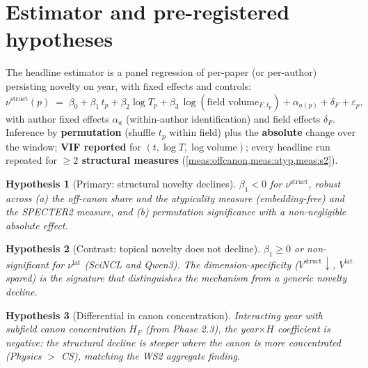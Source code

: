 \documentclass[11pt,letterpaper]{article}
\theoremstyle{definition}
\theoremstyle{plain}
\newtheorem{hypothesis}{Hypothesis}
\newcommand{\Vstruct}{V^{\mathrm{struct}}}
\newcommand{\Vlat}{V^{\mathrm{lat}}}
\begin{document}
\section{Estimator and pre-registered hypotheses}\label{sec:hypotheses}

The headline estimator is a panel regression of per-paper (or per-author)
persisting novelty on year, with fixed effects and controls:
\begin{equation}\label{eq:panel}
  \nu^{\mathrm{struct}}(p) \;=\; \beta_0 + \beta_1\,t_p
    + \beta_2 \log T_p + \beta_3\,\log(\text{field volume}_{F,t_p})
    + \alpha_{a(p)} + \delta_{F} + \varepsilon_p ,
\end{equation}
with author fixed effects $\alpha_a$ (within-author identification) and field
effects $\delta_F$. Inference by \textbf{permutation} (shuffle $t_p$ within
field) plus the \textbf{absolute} change over the window; \textbf{VIF reported}
for $(t,\log T,\log\text{volume})$; every headline run repeated for
\textbf{$\ge 2$ structural measures} (\cref{meas:offcanon,meas:atyp,meas:s2}).

\begin{hypothesis}[Primary: structural novelty declines]\label{hyp:decline}
$\beta_1 < 0$ for $\nu^{\mathrm{struct}}$, robust across (a) the off-canon share
and the atypicality measure (embedding-free) \emph{and} the SPECTER2 measure, and
(b) permutation significance with a non-negligible absolute effect.
\end{hypothesis}

\begin{hypothesis}[Contrast: topical novelty does not decline]\label{hyp:contrast}
$\beta_1 \ge 0$ or non-significant for $\nu^{\mathrm{lat}}$ (SciNCL and Qwen3).
The dimension-specificity ($\Vstruct\!\downarrow$, $\Vlat$ spared) is the
signature that distinguishes the mechanism from a generic novelty decline.
\end{hypothesis}

\begin{hypothesis}[Differential in canon concentration]\label{hyp:gradient}
Interacting year with subfield canon concentration $H_F$ (from Phase 2.3),
the year$\times H$ coefficient is negative: the structural decline is
\emph{steeper where the canon is more concentrated} (Physics $>$ CS), matching
the WS2 aggregate finding.
\end{hypothesis}
\end{document}
